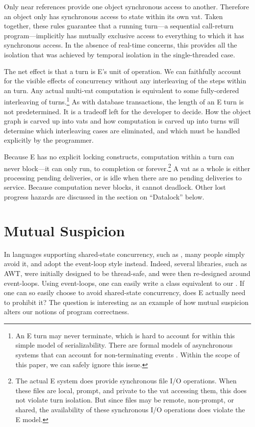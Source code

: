 \documentclass{llncs}
\begin{document}
Only near references provide one object synchronous access to
another. Therefore an object only has synchronous access to state
within its own vat. Taken together, these rules guarantee that a
running turn---a sequential call-return program---implicitly has
mutually exclusive access to everything to which it has synchronous
access. In the absence of real-time concerns, this provides all the
isolation that was achieved by temporal isolation in the
single-threaded case.

The net effect is that a turn is E's unit of operation. We can
faithfully account for the visible effects of concurrency without any
interleaving of the steps within an turn. Any actual multi-vat
computation is equivalent to some fully-ordered interleaving of
turns.\footnote{
%
An E turn may never terminate, which is hard to account for within
this simple model of serializability. There are formal models of
asynchronous systems that can account for non-terminating events
\cite{chandy:snapshots}. Within the scope of this paper, we can safely
ignore this issue.}
%
As with database transactions, the length of an E turn is not
predetermined. It is a tradeoff left for the developer to decide. How
the object graph is carved up into vats and how computation is carved
up into turns will determine which interleaving cases are eliminated,
and which must be handled explicitly by the programmer.

Because E has no explicit locking constructs, computation within a
turn can never block---it can only run, to completion or
forever.\footnote{
%
The actual E system does provide synchronous file I/O operations. When
these files are local, prompt, and private to the vat accessing them,
this does not violate turn isolation. But since files may be remote,
non-prompt, or shared, the availability of these synchronous I/O
operations does violate the E model.}
%
A vat as a whole is either processing pending deliveries, or is idle
when there are no pending deliveries to service. Because computation
never blocks, it cannot deadlock.  Other lost progress hazards are
discussed in the section on ``Datalock'' below.

\section{Mutual Suspicion}

In languages supporting shared-state concurrency, such as ,
many people simply avoid it, and adopt the event-loop style
instead. Indeed, several  libraries, such as AWT, were
initially designed to be thread-safe, and were then re-designed around
event-loops. Using event-loops, one can easily write a 
class equivalent to our .  If one can so easily
choose to avoid shared-state concurrency, does E actually need to
prohibit it?  The question is interesting as an example of how mutual
suspicion alters our notions of program correctness.
\end{document}
